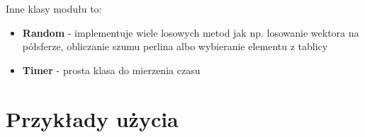 \documentclass[inz,longabstract]{iithesis}
\begin{document}
            Inne klasy modułu to:
            \begin{itemize}
                \item \textbf{Random} - implementuje wiele losowych metod jak np. losowanie wektora na półsferze, obliczanie szumu perlina albo wybieranie elementu z tablicy
                \item \textbf{Timer} - prosta klasa do mierzenia czasu  
            \end{itemize}
\chapter{Przykłady użycia}





\end{document}
